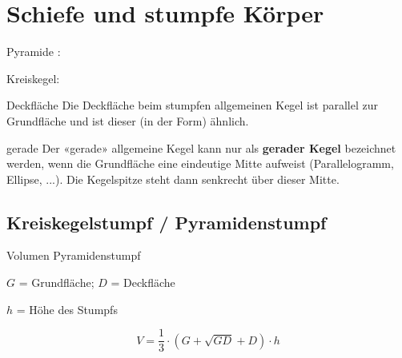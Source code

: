 \section{Schiefe und stumpfe Körper}

Pyramide : 

Kreiskegel: 



\begin{bemerkung}{Deckfläche}{}
Die Deckfläche beim stumpfen allgemeinen Kegel ist parallel zur
Grundfläche und ist dieser (in der Form) ähnlich.
\end{bemerkung}

\begin{bemerkung}{gerade}{}
  Der «gerade» allgemeine Kegel kann nur als \textbf{gerader Kegel}
  bezeichnet werden, wenn die Grundfläche eine eindeutige Mitte
  aufweist (Parallelogramm, Ellipse, ...). Die Kegelspitze steht dann senkrecht über dieser Mitte.
\end{bemerkung}
  \newpage


\subsection{Kreiskegelstumpf / Pyramidenstumpf}




\begin{gesetz}{Volumen Pyramidenstumpf}{}

  $G$ = Grundfläche; $D$ = Deckfläche

  $h$ = Höhe des Stumpfs
  
  $$ V = \frac13 \cdot{} \left(G + \sqrt{GD} + D \right) \cdot{} h $$

\end{gesetz}
\newpage

